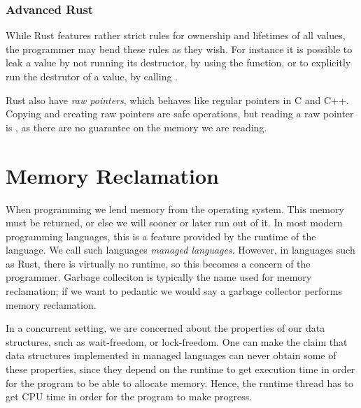 \documentclass[b5paper,twoside]{report}
\begin{document}

\subsection{Advanced Rust}
While Rust features rather strict rules for ownership and lifetimes of all values,
the programmer may bend these rules as they wish.
For instance it is possible to leak a value by not running its destructor,
by using the  function, or to explicitly run the destrutor of
a value, by calling .

Rust also have \emph{raw pointers}, which behaves like regular pointers in C and C++.
Copying and creating raw pointers are safe operations, but reading a raw pointer is
, as there are no guarantee on the memory we are reading.




\chapter{Memory Reclamation}

When programming we lend memory from the operating system. This memory must be returned, or else
we will sooner or later run out of it.
In most modern programming languages, this is a feature provided by the runtime of the language.
We call such languages \emph{managed languages}.
However, in languages such as Rust, there is virtually no runtime, so this becomes a concern
of the programmer.
Garbage colleciton is typically the name used for memory reclamation;
if we want to pedantic we would say a garbage collector performs memory reclamation.

In a concurrent setting, we are concerned about the properties of our data structures,
such as wait-freedom, or lock-freedom.
One can make the claim that data structures implemented in managed languages can never
obtain some of these properties, since they depend on the runtime to get execution time
in order for the program to be able to allocate memory.
Hence, the runtime thread has to get CPU time in order for the program to make progress.
\end{document}
